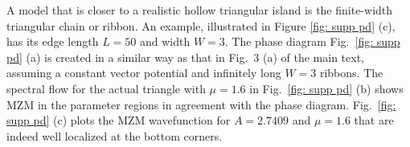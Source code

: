 \documentclass[aps,prb,showpacs,amsmath,amssymb,superscriptaddress]{revtex4-2}
\begin{document}
A model that is closer to a realistic hollow triangular island is the finite-width triangular chain or ribbon. An example, illustrated in Figure \ref{fig: supp pd} (c), has its edge length $L=50$ and width $W=3$. The phase diagram Fig.~\ref{fig: supp pd} (a) is created in a similar way as that in Fig.~3 (a) of the main text, assuming a constant vector potential and infinitely long $W=3$ ribbons. The spectral flow for the actual triangle with $\mu = 1.6$ in Fig.~\ref{fig: supp pd} (b) shows MZM in the parameter regions in agreement with the phase diagram. Fig.~\ref{fig: supp pd} (c) plots the MZM wavefunction for $A=2.7409$ and $\mu=1.6$ that are indeed well localized at the bottom corners.

\begin{figure}[ht]
  \\
  \hspace{-31.5pt}

\end{figure}
\end{document}
